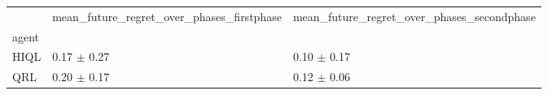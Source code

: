 \begin{tabular}{lll}
\toprule
 & mean_future_regret_over_phases_firstphase & mean_future_regret_over_phases_secondphase \\
agent &  &  \\
\midrule
HIQL & 0.17 $\pm$ 0.27 & 0.10 $\pm$ 0.17 \\
QRL & 0.20 $\pm$ 0.17 & 0.12 $\pm$ 0.06 \\
\bottomrule
\end{tabular}
